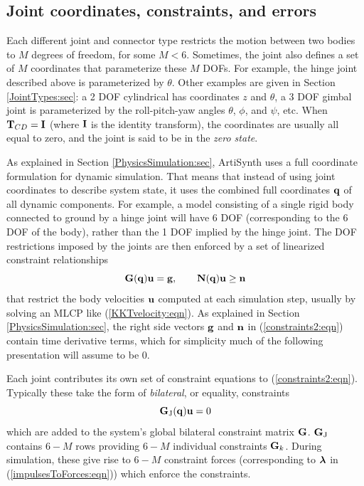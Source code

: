 \subsection{Joint coordinates, constraints, and errors}
\label{JointCoordinates:sec}

Each different joint and connector type restricts the motion between
two bodies to $M$ degrees of freedom, for some $M < 6$.  Sometimes,
the joint also defines a set of $M$ coordinates that parameterize
these $M$ DOFs. For example, the hinge joint described above is
parameterized by $\theta$. Other examples are given in
Section \ref{JointTypes:sec}: a 2 DOF cylindrical has coordinates $z$
and $\theta$, a 3 DOF gimbal joint is parameterized by the
roll-pitch-yaw angles $\theta$, $\phi$, and $\psi$, etc.  When
${\bf T}_{CD} = {\bf I}$ (where ${\bf I}$ is the identity transform), the coordinates
are usually all equal to zero, and the joint is said to be in the {\it
zero state}.

As explained in Section \ref{PhysicsSimulation:sec}, ArtiSynth uses a
full coordinate formulation for dynamic simulation. That means that
instead of using joint coordinates to describe system state, it uses
the combined full coordinates ${\bf q}$ of all dynamic components. For
example, a model consisting of a single rigid body connected to ground
by a hinge joint will have 6 DOF (corresponding to the 6 DOF of the
body), rather than the 1 DOF implied by the hinge joint.  The DOF
restrictions imposed by the joints are then enforced by a set of
linearized constraint relationships
%
\begin{equation}
{\bf G}({\bf q}) {\bf u} = {\bf g}, \qquad {\bf N}({\bf q}) {\bf u} \ge {\bf n}
\label{constraints2:eqn}
\end{equation}
%
that restrict the body velocities ${\bf u}$ computed at each simulation
step, usually by solving an MLCP like (\ref{KKTvelocity:eqn}). As
explained in Section \ref{PhysicsSimulation:sec}, the right side
vectors ${\bf g}$ and ${\bf n}$ in (\ref{constraints2:eqn}) contain time
derivative terms, which for simplicity much of the following
presentation will assume to be 0.

Each joint contributes its own set of constraint equations to
(\ref{constraints2:eqn}). Typically these take the form of {\it
bilateral}, or equality, constraints
%
\begin{equation}
{\bf G}_\text{J}({\bf q}) {\bf u} = 0
\label{bilateralG:eqn}
\end{equation}
%
which are added to the system's global bilateral constraint matrix
${\bf G}$. ${\bf G}_\text{J}$ contains $6 - M$ rows providing $6 - M$ individual
constraints ${\bf G}_k$.
During simulation, these give rise to $6 - M$ constraint
forces (corresponding to $\boldsymbol\lambda$ in (\ref{impulsesToForces:eqn}))
which enforce the constraints.


